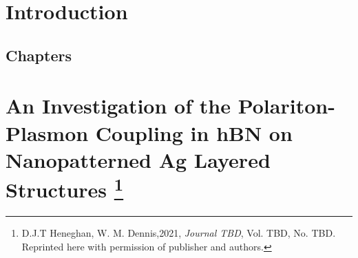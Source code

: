 \documentclass[
reprint,
amsmath,amssymb,
aip,
jap,
floatfix,
]{revtex4-2}
\begin{document}
\listoftables    %
\listoffigures   %

\newpage
{}  %



\chapter{Introduction}

   
\section{Chapters}
\label{sec:chap}




% 
% 
% 
% 
\chapter[An Investigation of the Polariton-Plasmon Coupling in hBN on Nanopatterned Ag Layered Structures]
  {An Investigation of the Polariton-Plasmon Coupling in hBN on Nanopatterned Ag Layered Structures%
  \footnote{D.J.T Heneghan, W. M. Dennis,2021, 
  \emph{Journal TBD}, Vol. TBD, No. TBD. \indent\indent Reprinted here with permission of publisher and authors.}}
  \label{chapter:Ag_hBN}

  \newpage
\end{document}
